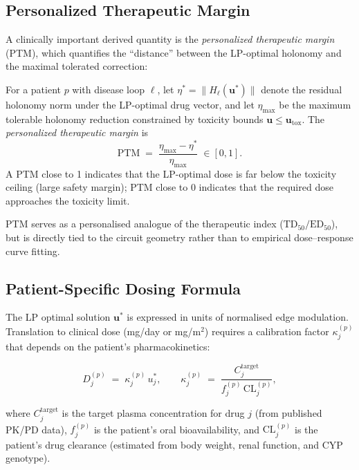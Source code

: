 \subsection{Personalized Therapeutic Margin}

A clinically important derived quantity is the \emph{personalized therapeutic
margin} (PTM), which quantifies the ``distance'' between the LP-optimal holonomy
and the maximal tolerated correction:

\begin{definition}
\label{def:ch10-ptm}
For a patient $p$ with disease loop $\ell$, let $\eta^* = \|H_\ell(\mathbf{u}^*)\|$
denote the residual holonomy norm under the LP-optimal drug vector, and let
$\eta_{\max}$ be the maximum tolerable holonomy reduction constrained by
toxicity bounds $\mathbf{u} \leq \mathbf{u}_{\mathrm{tox}}$.  The
\emph{personalized therapeutic margin} is
\begin{equation}
  \label{eq:ch10-ptm}
  \mathrm{PTM} \;=\; \frac{\eta_{\max} - \eta^*}{\eta_{\max}} \;\in [0, 1].
\end{equation}
A PTM close to 1 indicates that the LP-optimal dose is far below the toxicity
ceiling (large safety margin); PTM close to 0 indicates that the required dose
approaches the toxicity limit.
\end{definition}

PTM serves as a personalised analogue of the therapeutic index
($\mathrm{TD}_{50}/\mathrm{ED}_{50}$), but is directly tied to the circuit
geometry rather than to empirical dose--response curve fitting.

\subsection{Patient-Specific Dosing Formula}

The LP optimal solution $\mathbf{u}^*$ is expressed in units of normalised edge
modulation.  Translation to clinical dose (mg/day or mg/m$^2$) requires a
calibration factor $\kappa_j^{(p)}$ that depends on the patient's pharmacokinetics:

\begin{equation}
  \label{eq:ch10-dosing}
  D_j^{(p)} \;=\; \kappa_j^{(p)}\, u^*_j,
  \qquad
  \kappa_j^{(p)} \;=\; \frac{C_j^{\mathrm{target}}}{f_j^{(p)}\, \mathrm{CL}_j^{(p)}},
\end{equation}

\noindent where $C_j^{\mathrm{target}}$ is the target plasma concentration for
drug $j$ (from published PK/PD data), $f_j^{(p)}$ is the patient's oral
bioavailability, and $\mathrm{CL}_j^{(p)}$ is the patient's drug clearance
(estimated from body weight, renal function, and CYP genotype).

